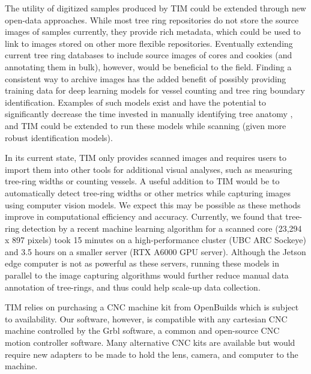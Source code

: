 \documentclass[a4paper,12pt]{article}
\begin{document}
The utility of digitized samples produced by TIM could be extended through new open-data approaches. 
While most tree ring repositories \citep[e.g.,the International Tree-Ring Data Bank or TreeSource's Tree-Rings Database for Canadian sites][]{grissino-mayer_international_1997,girardin_national_2021} do not store the source images of samples currently, they provide rich metadata, which could be used to link to images stored on other more flexible repositories. 
Eventually extending current tree ring databases to include source images of cores and cookies (and annotating them in bulk), however, would be beneficial to the field. Finding a consistent way to archive images has the added benefit of possibly providing training data for deep learning models for vessel counting and tree ring boundary identification. 
Examples of such models exist and have the potential to significantly decrease the time invested in manually identifying tree anatomy \citep{resente_mask_2021,polacek_automation_2023}, and TIM could be extended to run these models while scanning (given more robust identification models).


In its current state, TIM only provides scanned images and requires users to import them into other tools for additional visual analyses, such as measuring tree-ring widths or counting vessels.
A useful addition to TIM would be to automatically detect tree-ring widths or other metrics while capturing images using computer vision models. We expect this may be possible as these methods improve in computational efficiency and accuracy. Currently, we found that tree-ring detection by a recent machine learning algorithm  \citep[R-CNN presented by][]{polacek_automation_2023} for a scanned core (23,294 x 897 pixels) took 15 minutes on a high-performance cluster (UBC ARC Sockeye) and 3.5 hours on a smaller server (RTX A6000 GPU server). 
Although the Jetson edge computer is not as powerful as these servers, running these models in parallel to the image capturing algorithms would further reduce manual data annotation of tree-rings, and thus could help scale-up data collection.

TIM relies on purchasing a CNC machine kit from OpenBuilds which is subject to availability. Our software, however, is compatible with any cartesian CNC machine controlled by the Grbl software, a common and open-source CNC motion controller software.
Many alternative CNC kits are available but would require new adapters to be made to hold the lens, camera, and computer to the machine.
\end{document}
